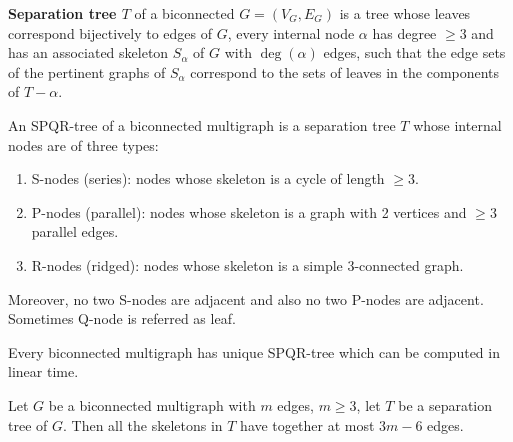 \begin{defn}
	\textbf{Separation tree $T$} of a biconnected $G = (V_G, E_G)$ is a tree whose leaves correspond bijectively to edges of $G$, every internal node $\alpha$ has degree $\geq 3$ and has an associated skeleton $S_\alpha$ of $G$ with $\deg(\alpha)$ edges, such that the edge sets of the pertinent graphs of $S_\alpha$ correspond to the sets of leaves in the components of $T - \alpha$.
\end{defn}

\begin{defn}
	An SPQR-tree of a biconnected multigraph is a separation tree $T$ whose internal nodes are of three types:
	
	\begin{enumerate}
		\item S-nodes (series): nodes whose skeleton is a cycle of length $\geq 3$.
		\item P-nodes (parallel): nodes whose skeleton is a graph with 2 vertices and $\geq 3$ parallel edges.
		\item R-nodes (ridged): nodes whose skeleton is a simple 3-connected graph.
	\end{enumerate}
	
	\noindent Moreover, no two S-nodes are adjacent and also no two P-nodes are adjacent. Sometimes Q-node is referred as leaf.
\end{defn}

\begin{fact}
	Every biconnected multigraph has unique SPQR-tree which can be computed in linear time.
\end{fact}

\begin{thm}
	Let $G$ be a biconnected multigraph with $m$ edges, $m \geq 3$, let $T$ be a separation tree of $G$. Then all the skeletons in $T$ have together at most $3m-6$ edges.
\end{thm}


